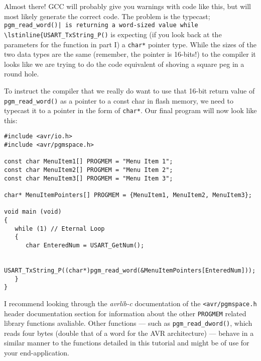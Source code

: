 \documentclass[a4paper,oneside]{book}
\begin{document}
Almost there! GCC will probably give you warnings with code like this, but will most likely generate the correct code. The problem is the typecast; \lstinline{pgm_read_word()| is returning a word-sized value while \lstinline{USART_TxString_P()} is expecting (if you look back at the parameters for the function in part I) a \lstinline{char*} pointer type. While the sizes of the two data types are the same (remember, the pointer is 16-bits!) to the compiler it looks like we are trying to do the code equivalent of shoving a square peg in a round hole.

To instruct the compiler that we really do want to use that 16-bit return value of \lstinline{pgm_read_word()} as a pointer to a const char in flash memory, we need to typecast it to a pointer in the form of \lstinline{char*}. Our final program will now look like this:

\begin{center}
\begin{lstlisting}
#include <avr/io.h>
#include <avr/pgmspace.h>

const char MenuItem1[] PROGMEM = "Menu Item 1";
const char MenuItem2[] PROGMEM = "Menu Item 2";
const char MenuItem3[] PROGMEM = "Menu Item 3";

char* MenuItemPointers[] PROGMEM = {MenuItem1, MenuItem2, MenuItem3};

void main (void)
{
   while (1) // Eternal Loop
   {
      char EnteredNum = USART_GetNum();

      USART_TxString_P((char*)pgm_read_word(&MenuItemPointers[EnteredNum]));
   }
}
\end{lstlisting}
\end{center}

I recommend looking through the \textit{avrlib-c} documentation of the \lstinline{<avr/pgmspace.h} header documentation section for information about the other \lstinline{PROGMEM} related library functions avaliable. Other functions --- such as \lstinline{pgm_read_dword()}, which reads four bytes (double that of a word for the AVR architecture) --- behave in a similar manner to the functions detailed in this tutorial and might be of use for your end-application.
\end{document}
